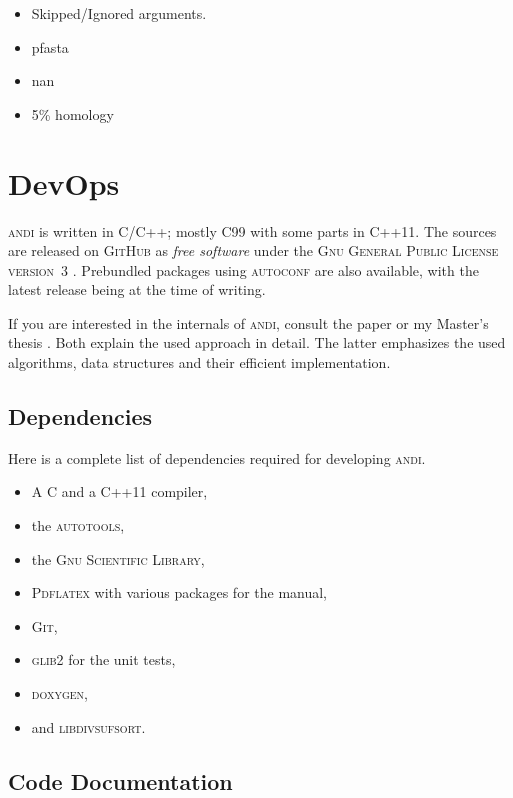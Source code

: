 \documentclass[a4paper,
  10pt,
  english,
  DIV=12,
  BCOR=8mm]{scrbook}
\newcommand{\algo}[1]{\textsc{{#1}}}
\newcommand{\andi}{\algo{andi}\xspace}
\begin{document}
\begin{itemize}
  \item Skipped/Ignored arguments.
  \item pfasta
  \item nan
  \item 5\% homology
\end{itemize}




\chapter{DevOps} %

\andi is written in C/C++; mostly C99 with some parts in C++11. The sources are released on \algo{GitHub} as \emph{free software} under the \textsc{Gnu General Public License version~3} \cite{GPL}. Prebundled packages using \algo{autoconf} are also available, with the latest release being {\version} at the time of writing.

If you are interested in the internals of \algo{andi}, consult the paper \cite{andi} or my Master's thesis \cite{kloetzl}. Both explain the used approach in detail. The latter emphasizes the used algorithms, data structures and their efficient implementation.

\section{Dependencies}

Here is a complete list of dependencies required for developing \algo{andi}.

\begin{itemize}
  \item A C and a C++11 compiler,
  \item the \algo{autotools},
  \item the \algo{Gnu Scientific Library},
  \item \algo{Pdflatex} with various packages for the manual,
  \item \algo{Git},
  \item \algo{glib2} for the unit tests,
  \item \algo{doxygen},
  \item and \algo{libdivsufsort}.
\end{itemize}


\section{Code Documentation}
\end{document}
